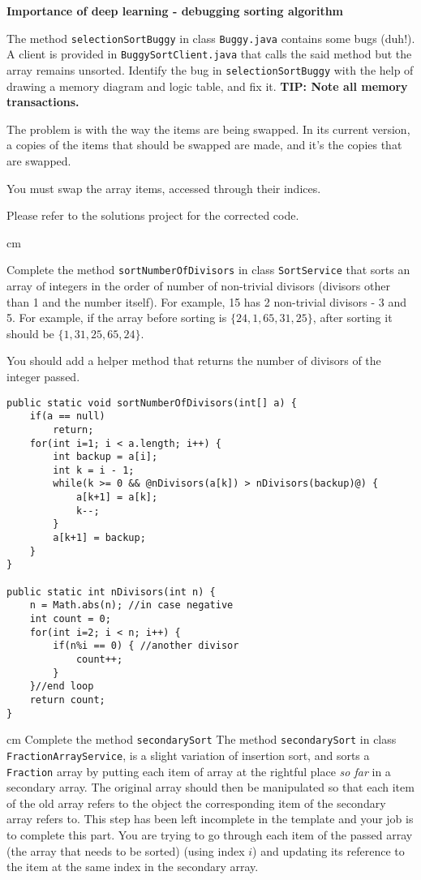 \begin{questions}
\question  \textbf{Importance of deep learning - debugging sorting algorithm} \vskip 0.5cm

The method \texttt{selectionSortBuggy} in class \texttt{Buggy.java} contains some bugs (duh!).
A client is provided in \texttt{BuggySortClient.java} that calls the said method but the array remains unsorted. Identify the bug in \texttt{selectionSortBuggy} with the help of drawing a memory diagram and logic table, and fix it. \textbf{TIP: Note all memory transactions.}

\begin{solution}
The problem is with the way the items are being swapped. In its current version, a copies of the items that should be swapped are made, and it's the copies that are swapped.
	
You must swap the array items, accessed through their indices.	

Please refer to the solutions project for the corrected code.
\end{solution}	

 cm 

\question  Complete the method \texttt{sortNumberOfDivisors} in class \texttt{SortService} that sorts an array of integers in the order of number of non-trivial divisors (divisors other than 1 and the number itself). For example, 15 has 2 non-trivial divisors - 3 and 5. For example, if the array before sorting is $\{24, 1, 65, 31, 25\}$, after sorting it should be $\{1, 31, 25, 65, 24\}$. 

You should add a helper method that returns the number of divisors of the integer passed. 

\begin{solution}
\begin{lstlisting}[style=buggy]
public static void sortNumberOfDivisors(int[] a) {
	if(a == null) 
		return;
	for(int i=1; i < a.length; i++) {
		int backup = a[i];
		int k = i - 1;
		while(k >= 0 && @nDivisors(a[k]) > nDivisors(backup)@) {
			a[k+1] = a[k];
			k--;
		}
		a[k+1] = backup;
	}
}

public static int nDivisors(int n) {
	n = Math.abs(n); //in case negative
	int count = 0;
	for(int i=2; i < n; i++) {
		if(n%i == 0) { //another divisor
			count++;
		}
	}//end loop
	return count;
}	
\end{lstlisting}
\end{solution}

 cm \question Complete the method \texttt{secondarySort} \vskip 0.5cm
The method \texttt{secondarySort} in class \texttt{FractionArrayService}, is a slight variation of insertion sort, and sorts a \texttt{Fraction} array by putting each item of array at the rightful place \emph{so far} in a secondary array. The original array should then be manipulated so that each item of the old array refers to the object the corresponding item of the secondary array refers to. This step has been left incomplete in the template and your job is to complete this part. You are trying to go through each item of the passed array (the array that needs to be sorted) (using index $i$) and updating its reference to the item at the same index in the secondary array.


\end{questions}
